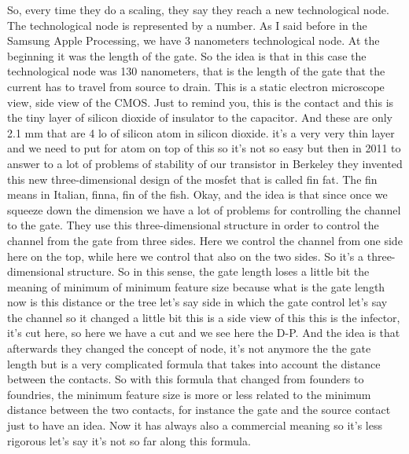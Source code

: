 So, every time they do a scaling, they say they reach a new technological node. The technological node is represented by a number. As I said before in the Samsung Apple Processing, we have 3 nanometers technological node. At the beginning it was the length of the gate. So the idea is that in this case the technological node was 130 nanometers, that is the length of the gate that the current has to travel from source to drain. This is a static electron microscope view, side view of the CMOS. Just to remind you, this is the contact and this is the tiny layer of silicon dioxide of insulator to the capacitor. And these are only 2.1 mm that are 4 lo of silicon atom in silicon dioxide. it's a very very thin layer and we need to put for atom on top of this so it's not so easy but then in 2011 to answer to a lot of problems of stability of our transistor in Berkeley they invented this new three-dimensional design of the mosfet that is called fin fat. The fin means in Italian, finna, fin of the fish. Okay, and the idea is that since once we squeeze down the dimension we have a lot of problems for controlling the channel to the gate. They use this three-dimensional structure in order to control the channel from the gate from three sides. Here we control the channel from one side here on the top, while here we control that also on the two sides. So it's a three-dimensional structure. So in this sense, the gate length loses a little bit the meaning of minimum of minimum feature size because what is the gate length now is this distance or the tree let's say side in which the gate control let's say the channel so it changed a little bit this is a side view of this this is the infector, it's cut here, so here we have a cut and we see here the D-P. And the idea is that afterwards they changed the concept of node, it's not anymore the the gate length but is a very complicated formula that takes into account the distance between the contacts. So with this formula that changed from founders to foundries, the minimum feature size is more or less related to the minimum distance between the two contacts, for instance the gate and the source contact just to have an idea. Now it has always also a commercial meaning so it's less rigorous let's say it's not so far along this formula.
